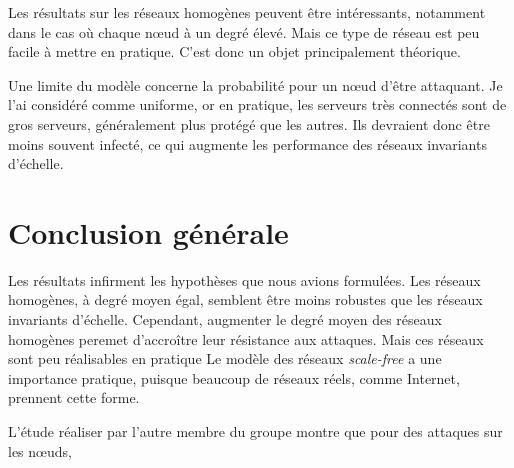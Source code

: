 \documentclass[12pt,a4paper]{article}
\begin{document}
Les résultats sur les réseaux homogènes peuvent être intéressants, notamment dans le cas où chaque nœud à un degré élevé.
Mais ce type de réseau est peu facile à mettre en pratique.
C'est donc un objet principalement théorique.

Une limite du modèle concerne la probabilité pour un nœud d'être attaquant.
Je l'ai considéré comme uniforme, or en pratique, les serveurs très connectés sont de gros serveurs, généralement plus protégé que les autres.
Ils devraient donc être moins souvent infecté, ce qui augmente les performance des réseaux invariants d'échelle.



\section{Conclusion générale} %

Les résultats infirment les hypothèses que nous avions formulées.
Les réseaux homogènes, à degré moyen égal, semblent être moins robustes que les réseaux invariants d'échelle.
Cependant, augmenter le degré moyen des réseaux homogènes peremet d'accroître leur résistance aux attaques.
Mais ces réseaux sont peu réalisables en pratique
Le modèle des réseaux \emph{scale-free} a une importance pratique, puisque beaucoup de réseaux réels, comme Internet, prennent cette forme.

L'étude réaliser par l'autre membre du groupe montre que pour des attaques sur les nœuds,

\end{document}
